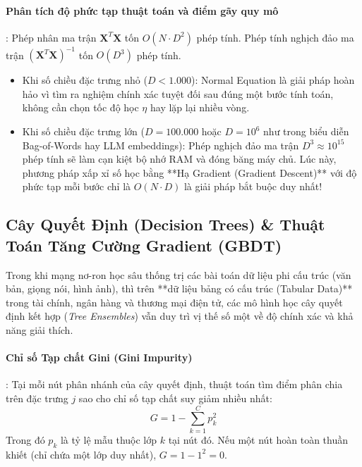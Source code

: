 \paragraph{Phân tích độ phức tạp thuật toán và điểm gãy quy mô}:
Phép nhân ma trận $\mathbf{X}^T \mathbf{X}$ tốn $O(N \cdot D^2)$ phép tính. Phép tính nghịch đảo ma trận $(\mathbf{X}^T \mathbf{X})^{-1}$ tốn $O(D^3)$ phép tính.
\begin{itemize}
  \item Khi số chiều đặc trưng nhỏ ($D < 1.000$): Normal Equation là giải pháp hoàn hảo vì tìm ra nghiệm chính xác tuyệt đối sau đúng một bước tính toán, không cần chọn tốc độ học $\eta$ hay lặp lại nhiều vòng.
  \item Khi số chiều đặc trưng lớn ($D = 100.000$ hoặc $D = 10^6$ như trong biểu diễn Bag-of-Words hay LLM embeddings): Phép nghịch đảo ma trận $D^3 \approx 10^{15}$ phép tính sẽ làm cạn kiệt bộ nhớ RAM và đóng băng máy chủ. Lúc này, phương pháp xấp xỉ số học bằng **Hạ Gradient (Gradient Descent)** với độ phức tạp mỗi bước chỉ là $O(N \cdot D)$ là giải pháp bắt buộc duy nhất!
\end{itemize}

\subsection{Cây Quyết Định (Decision Trees) \& Thuật Toán Tăng Cường Gradient (GBDT)}

Trong khi mạng nơ-ron học sâu thống trị các bài toán dữ liệu phi cấu trúc (văn bản, giọng nói, hình ảnh), thì trên **dữ liệu bảng có cấu trúc (Tabular Data)** trong tài chính, ngân hàng và thương mại điện tử, các mô hình học cây quyết định kết hợp (\textit{Tree Ensembles}) vẫn duy trì vị thế số một về độ chính xác và khả năng giải thích.

\paragraph{Chỉ số Tạp chất Gini (Gini Impurity)}:
Tại mỗi nút phân nhánh của cây quyết định, thuật toán tìm điểm phân chia trên đặc trưng $j$ sao cho chỉ số tạp chất suy giảm nhiều nhất:
\begin{equation}
G = 1 - \sum_{k=1}^C p_k^2
\label{eq:gini-impurity-def}
\end{equation}
Trong đó $p_k$ là tỷ lệ mẫu thuộc lớp $k$ tại nút đó. Nếu một nút hoàn toàn thuần khiết (chỉ chứa một lớp duy nhất), $G = 1 - 1^2 = 0$.

